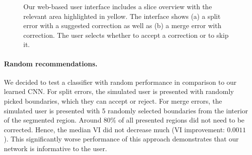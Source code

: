 \begin{figure}[ht]
 \centering
    \hfill
	\caption{Our web-based user interface includes a slice overview with the relevant area highlighted in yellow. The interface shows (a) a split error with a suggested correction as well as (b) a merge error with correction. The user selects whether to accept a correction or to skip it.}
\label{fig:cylinderresults}
\end{figure}
\paragraph{Random recommendations.} We decided to test a classifier with random performance in comparison to our learned CNN. For split errors, the simulated user is presented with randomly picked boundaries, which they can accept or reject. For merge errors, the simulated user is presented with 5 randomly selected boundaries from the interior of the segmented region. Around 80\% of all presented regions did not need to be corrected. Hence, the median VI did not decrease much (VI improvement: $0.0011$). This significantly worse performance of this approach demonstrates that our network is informative to the user.

